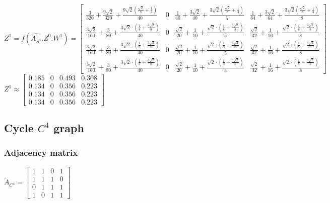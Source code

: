 \documentclass[a4paper]{article}
\begin{document}
$Z^{1} = f(\hat{A_{S^4}}.Z^{0}. W^{1}) =  \left[\begin{matrix}\frac{3}{320} + \frac{9 \sqrt{2}}{320} + \frac{9 \sqrt{2} \left(\frac{\sqrt{2}}{8} + \frac{1}{4}\right)}{40} & 0 & \frac{1}{40} + \frac{3 \sqrt{2}}{40} + \frac{3 \sqrt{2} \left(\frac{\sqrt{2}}{8} + \frac{1}{4}\right)}{5} & \frac{1}{64} + \frac{3 \sqrt{2}}{64} + \frac{3 \sqrt{2} \left(\frac{\sqrt{2}}{8} + \frac{1}{4}\right)}{8}\\\frac{3 \sqrt{2}}{160} + \frac{3}{80} + \frac{3 \sqrt{2} \cdot \left(\frac{1}{8} + \frac{3 \sqrt{2}}{8}\right)}{40} & 0 & \frac{\sqrt{2}}{20} + \frac{1}{10} + \frac{\sqrt{2} \cdot \left(\frac{1}{8} + \frac{3 \sqrt{2}}{8}\right)}{5} & \frac{\sqrt{2}}{32} + \frac{1}{16} + \frac{\sqrt{2} \cdot \left(\frac{1}{8} + \frac{3 \sqrt{2}}{8}\right)}{8}\\\frac{3 \sqrt{2}}{160} + \frac{3}{80} + \frac{3 \sqrt{2} \cdot \left(\frac{1}{8} + \frac{3 \sqrt{2}}{8}\right)}{40} & 0 & \frac{\sqrt{2}}{20} + \frac{1}{10} + \frac{\sqrt{2} \cdot \left(\frac{1}{8} + \frac{3 \sqrt{2}}{8}\right)}{5} & \frac{\sqrt{2}}{32} + \frac{1}{16} + \frac{\sqrt{2} \cdot \left(\frac{1}{8} + \frac{3 \sqrt{2}}{8}\right)}{8}\\\frac{3 \sqrt{2}}{160} + \frac{3}{80} + \frac{3 \sqrt{2} \cdot \left(\frac{1}{8} + \frac{3 \sqrt{2}}{8}\right)}{40} & 0 & \frac{\sqrt{2}}{20} + \frac{1}{10} + \frac{\sqrt{2} \cdot \left(\frac{1}{8} + \frac{3 \sqrt{2}}{8}\right)}{5} & \frac{\sqrt{2}}{32} + \frac{1}{16} + \frac{\sqrt{2} \cdot \left(\frac{1}{8} + \frac{3 \sqrt{2}}{8}\right)}{8}\end{matrix}\right]$
$Z^{1}  \approx \begin{bmatrix}
    0.185 &  0 &  0.493 &  0.308\\
    0.134 &  0 &  0.356 &  0.223\\
    0.134 &  0 &  0.356 &  0.223\\
    0.134 &  0 &  0.356 &  0.223
\end{bmatrix}$

\break

\subsection*{Cycle $C^{4}$ graph}
\subsubsection*{Adjacency matrix}
$\tilde{A}_{C^4} = \begin{bmatrix}
    1 &  1  &  0  &  1\\
    1  &  1  &  1  &  0 \\
    0  &  1  &  1  &  1 \\
    1  &  0  &  1  &  1 
\end{bmatrix}$
\end{document}
